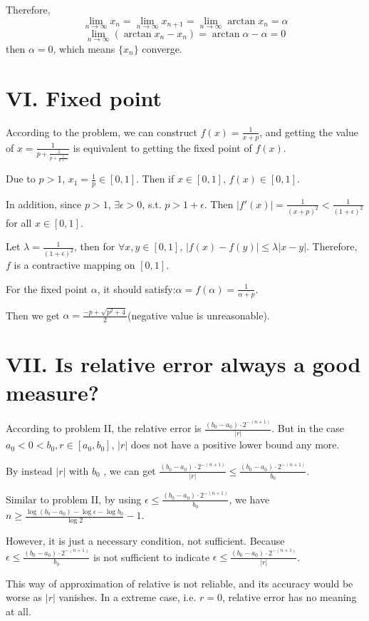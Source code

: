 \documentclass[a4paper]{article}
\begin{document}
Therefore,
$$
\lim_{n\rightarrow\infty}x_n = \lim_{n\rightarrow\infty}x_{n+1} = \lim_{n\rightarrow\infty}\arctan{x_n} = \alpha
$$
$$
\lim_{n\rightarrow\infty}(\arctan{x_n} - x_n) = \arctan{\alpha} - \alpha = 0
$$
then $\alpha = 0$, which means $\{x_n\}$ converge.

\section*{VI. Fixed point}
According to the problem, we can construct $f(x) = \frac{1}{x+p}$, and getting the value of $x = \frac{1}{p + \frac{1}{p + \frac{1}{p + \cdots}}}$ is equivalent to getting the fixed point of $f(x)$.

Due to $ p > 1$, $x_1 = \frac{1}{p} \in [0,1]$. Then if $x \in [0,1]$, $f(x) \in [0,1]$.

In addition, since $p > 1$, $\exists \epsilon > 0$, s.t. $p > 1+\epsilon$. Then $|f'(x)| = \frac{1}{(x+p)^2} < \frac{1}{(1+\epsilon)^2}$ for all $x \in [0,1]$.

Let $\lambda = \frac{1}{(1+\epsilon)^2}$, then for $\forall x, y \in [0,1]$, $|f(x) - f(y)| \leq \lambda|x - y|$. Therefore, $f$ is a contractive mapping on $[0,1]$.

For the fixed point $\alpha$, it should satisfy:$\alpha = f(\alpha) = \frac{1}{\alpha + p}$.

Then we get $\alpha = \frac{-p+\sqrt{p^2+4}}{2}$(negative value is unreasonable).

\section*{VII. Is relative error always a good measure?}
According to problem II, the relative error is $\frac{(b_0-a_0)\cdot 2^{-(n+1)}}{|r|}$. But in the case $a_0 < 0 < b_0, r \in [a_0,b_0]$, $|r|$ does not have a positive lower bound any more.

By instead $|r|$ with $b_0$ , we can get  $\frac{(b_0-a_0)\cdot 2^{-(n+1)}}{|r|} \leq \frac{(b_0-a_0)\cdot 2^{-(n+1)}}{b_0}$.

Similar to problem II, by using $\epsilon \leq \frac{(b_0-a_0)\cdot 2^{-(n+1)}}{b_0}$, we have $n \geq \frac{\log(b_0-a_0)-\log\epsilon-\log b_0}{\log 2} - 1$.

However, it is just a necessary condition, not sufficient. Because $\epsilon \leq \frac{(b_0-a_0)\cdot 2^{-(n+1)}}{b_0}$ is not sufficient to indicate $\epsilon \leq \frac{(b_0-a_0)\cdot 2^{-(n+1)}}{|r|}$.

This way of approximation of relative is not reliable, and its accuracy would be worse as $|r|$ vanishes. In a extreme case, i.e. $r = 0$, relative error has no meaning at all.
\end{document}

